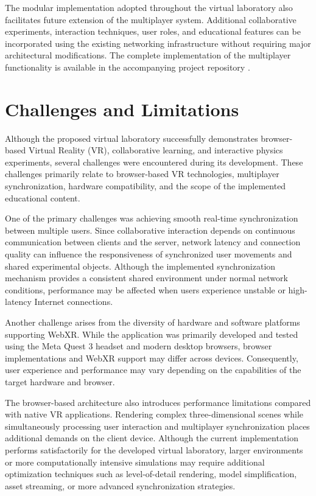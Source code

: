 The modular implementation adopted throughout the virtual laboratory also facilitates future extension of the multiplayer system. Additional collaborative experiments, interaction techniques, user roles, and educational features can be incorporated using the existing networking infrastructure without requiring major architectural modifications. The complete implementation of the multiplayer functionality is available in the accompanying project repository \cite{thesisRepo}.

\section{Challenges and Limitations}

Although the proposed virtual laboratory successfully demonstrates browser-based Virtual Reality (VR), collaborative learning, and interactive physics experiments, several challenges were encountered during its development. These challenges primarily relate to browser-based VR technologies, multiplayer synchronization, hardware compatibility, and the scope of the implemented educational content.

One of the primary challenges was achieving smooth real-time synchronization between multiple users. Since collaborative interaction depends on continuous communication between clients and the server, network latency and connection quality can influence the responsiveness of synchronized user movements and shared experimental objects. Although the implemented synchronization mechanism provides a consistent shared environment under normal network conditions, performance may be affected when users experience unstable or high-latency Internet connections.

Another challenge arises from the diversity of hardware and software platforms supporting WebXR. While the application was primarily developed and tested using the Meta Quest 3 headset and modern desktop browsers, browser implementations and WebXR support may differ across devices. Consequently, user experience and performance may vary depending on the capabilities of the target hardware and browser.

The browser-based architecture also introduces performance limitations compared with native VR applications. Rendering complex three-dimensional scenes while simultaneously processing user interaction and multiplayer synchronization places additional demands on the client device. Although the current implementation performs satisfactorily for the developed virtual laboratory, larger environments or more computationally intensive simulations may require additional optimization techniques such as level-of-detail rendering, model simplification, asset streaming, or more advanced synchronization strategies.

